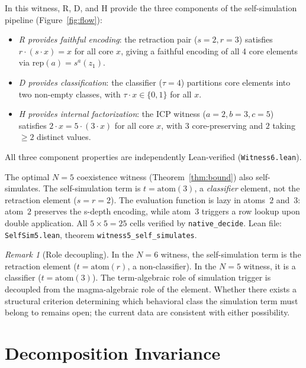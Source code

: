 \documentclass[sigconf,screen,review,anonymous]{acmart}
\newcommand{\dotop}{\cdot}
\theoremstyle{remark}
\newtheorem{remark}{Remark}
\begin{document}
In this witness, R, D, and H provide the three components of the self-simulation pipeline (Figure~\ref{fig:flow}):
\begin{itemize}
  \item \emph{R provides faithful encoding}: the retraction pair ($s\!=\!2, r\!=\!3$) satisfies $r \dotop (s \dotop x) = x$ for all core $x$, giving a faithful encoding of all 4 core elements via $\text{rep}(a) = s^a(z_1)$.
  \item \emph{D provides classification}: the classifier ($\tau\!=\!4$) partitions core elements into two non-empty classes, with $\tau \dotop x \in \{0, 1\}$ for all $x$.
  \item \emph{H provides internal factorization}: the ICP witness ($a\!=\!2, b\!=\!3, c\!=\!5$) satisfies $2 \dotop x = 5 \dotop (3 \dotop x)$ for all core $x$, with $3$ core-preserving and $2$ taking $\geq 2$ distinct values.
\end{itemize}
All three component properties are independently Lean-verified (\texttt{Witness6.lean}).

\begin{theorem}[Self-Simulation at $N\!=\!5$]
\label{thm:selfsim5}
The optimal $N\!=\!5$ coexistence witness (Theorem~\ref{thm:bound}) also self-simulates. The self-simulation term is $t = \text{atom}(3)$, a \emph{classifier} element, not the retraction element ($s\!=\!r\!=\!2$). The evaluation function is lazy in atoms~$2$ and~$3$: atom~$2$ preserves the s-depth encoding, while atom~$3$ triggers a row lookup upon double application. All $5 \times 5 = 25$ cells verified by \texttt{native\_decide}. Lean file: \texttt{SelfSim5.lean}, theorem \texttt{witness5\_self\_simulates}.
\end{theorem}

\begin{remark}[Role decoupling]
In the $N\!=\!6$ witness, the self-simulation term is the retraction element ($t = \text{atom}(r)$, a non-classifier). In the $N\!=\!5$ witness, it is a classifier ($t = \text{atom}(3)$). The term-algebraic role of simulation trigger is decoupled from the magma-algebraic role of the element. Whether there exists a structural criterion determining which behavioral class the simulation term must belong to remains open; the current data are consistent with either possibility.
\end{remark}

\section{Decomposition Invariance}
\label{sec:invariance}
\end{document}
